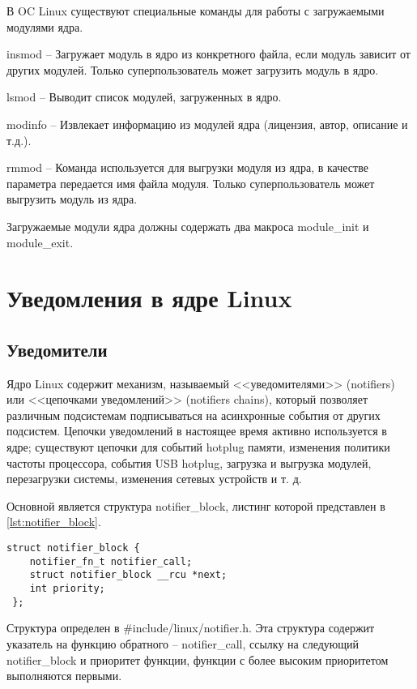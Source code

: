 В OC Linux существуют специальные команды для работы с загружаемыми модулями ядра.

insmod -- Загружает модуль в ядро из конкретного файла, если модуль зависит от других модулей. Только суперпользователь может загрузить модуль в ядро.

lsmod -- Выводит список модулей, загруженных в ядро.

modinfo -- Извлекает информацию из модулей ядра (лицензия, автор, описание и т.д.).

rmmod -- Команда используется для выгрузки модуля из ядра, в качестве параметра передается имя файла модуля. Только суперпользователь может выгрузить модуль из ядра.

Загружаемые модули ядра должны содержать два макроса module\_init и module\_exit.

\section{\textbf{Уведомления в ядре Linux}}

\subsection{\textbf{Уведомители}}

Ядро Linux содержит механизм, называемый <<уведомителями>> (notifiers) или <<цепочками уведомлений>> (notifiers chains), который позволяет различным подсистемам подписываться на асинхронные события от других подсистем. Цепочки уведомлений в настоящее время активно используется в ядре; существуют цепочки для событий hotplug памяти, изменения политики частоты процессора, события USB hotplug, загрузка и выгрузка модулей, перезагрузки системы, изменения сетевых устройств и т. д. \cite{notifications}

Основной является структура notifier\_block, листинг которой представлен в \ref{lst:notifier_block}.

 \begin{lstlisting}[caption = Структура notifier\_block, label =  lst:notifier_block]
 struct notifier_block {
    notifier_fn_t notifier_call;
    struct notifier_block __rcu *next;
    int priority;
 };
 \end{lstlisting}
 
Структура определен в \#include/linux/notifier.h. Эта структура содержит указатель на функцию обратного -- notifier\_call, ссылку на следующий notifier\_block и приоритет функции, функции с более высоким приоритетом выполняются первыми.

